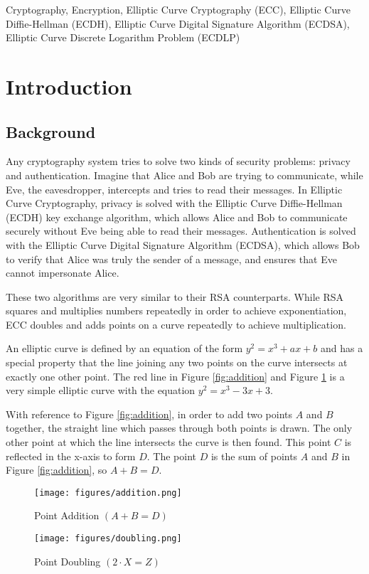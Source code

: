 \documentclass[12pt,a4paper]{article}
\begin{document}
\begin{keywords}
Cryptography, Encryption, Elliptic Curve Cryptography (ECC), Elliptic Curve Diffie-Hellman (ECDH), 
Elliptic Curve Digital Signature Algorithm (ECDSA), Elliptic Curve Discrete Logarithm Problem (ECDLP)
\end{keywords}


\section{Introduction} \noindent
\subsection{Background} \noindent
Any cryptography system tries to solve two kinds of security problems: privacy and authentication. 
Imagine that Alice and Bob are trying to communicate, while Eve, the eavesdropper, intercepts and tries to read their messages. 
In Elliptic Curve Cryptography, privacy is solved with the Elliptic Curve Diffie-Hellman (ECDH) key exchange algorithm, 
which allows Alice and Bob to communicate securely without Eve being able to read their messages. 
Authentication is solved with the Elliptic Curve Digital Signature Algorithm (ECDSA), 
which allows Bob to verify that Alice was truly the sender of a message, and ensures that Eve cannot impersonate Alice. 

These two algorithms are very similar to their RSA counterparts. 
While RSA squares and multiplies numbers repeatedly in order to achieve exponentiation, 
ECC doubles and adds points on a curve repeatedly to achieve multiplication. 

An elliptic curve is defined by an equation of the form $y^2 = x^3 + ax + b$ 
and has a special property that the line joining any two points on the curve intersects at exactly one other point. 
The red line in Figure \ref{fig:addition} and Figure \ref{fig:doubling} is a very simple elliptic curve with the equation $y^2 = x^3 - 3x + 3$. 

With reference to Figure \ref{fig:addition}, in order to add two points $A$ and $B$ together, 
the straight line which passes through both points is drawn. 
The only other point at which the line intersects the curve is then found. 
This point $C$ is reflected in the x-axis to form $D$. 
The point $D$ is the sum of points $A$ and $B$ in Figure \ref{fig:addition}, so $A + B = D$. 

\begin{figure}[!htb]
    \begin{minipage}{0.48\textwidth}
        \centering
        \texttt{[image: figures/addition.png]}
        \caption{Point Addition $(A + B = D)$}
        \label{fig:addition}
    \end{minipage}\hfill
    \begin{minipage}{0.48\textwidth}
        \centering
        \texttt{[image: figures/doubling.png]}
        \caption{Point Doubling $(2 \cdot X = Z)$}
        \label{fig:doubling}
    \end{minipage}
\end{figure}
\end{document}
